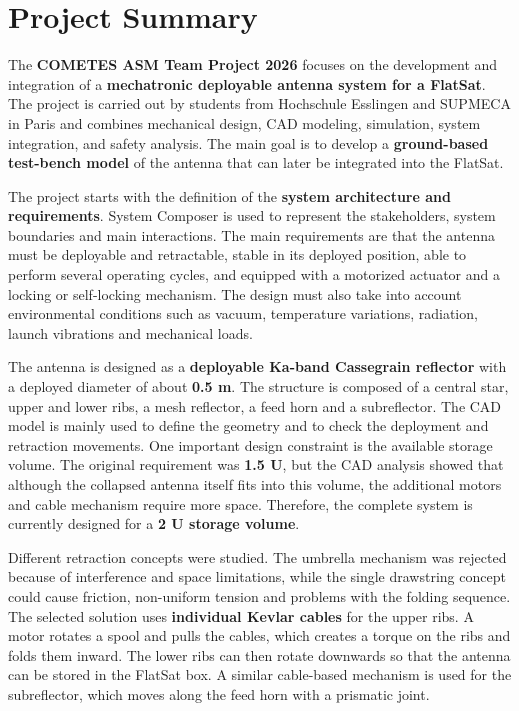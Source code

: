 \chapter{Project Summary}

The \textbf{COMETES ASM Team Project 2026} focuses on the development and integration of a \textbf{mechatronic deployable antenna system for a FlatSat}. The project is carried out by students from Hochschule Esslingen and SUPMECA in Paris and combines mechanical design, CAD modeling, simulation, system integration, and safety analysis. The main goal is to develop a \textbf{ground-based test-bench model} of the antenna that can later be integrated into the FlatSat.

The project starts with the definition of the \textbf{system architecture and requirements}. System Composer is used to represent the stakeholders, system boundaries and main interactions. The main requirements are that the antenna must be deployable and retractable, stable in its deployed position, able to perform several operating cycles, and equipped with a motorized actuator and a locking or self-locking mechanism. The design must also take into account environmental conditions such as vacuum, temperature variations, radiation, launch vibrations and mechanical loads.

The antenna is designed as a \textbf{deployable Ka-band Cassegrain reflector} with a deployed diameter of about \textbf{0.5 m}. The structure is composed of a central star, upper and lower ribs, a mesh reflector, a feed horn and a subreflector. The CAD model is mainly used to define the geometry and to check the deployment and retraction movements. One important design constraint is the available storage volume. The original requirement was \textbf{1.5 U}, but the CAD analysis showed that although the collapsed antenna itself fits into this volume, the additional motors and cable mechanism require more space. Therefore, the complete system is currently designed for a \textbf{2 U storage volume}.

Different retraction concepts were studied. The umbrella mechanism was rejected because of interference and space limitations, while the single drawstring concept could cause friction, non-uniform tension and problems with the folding sequence. The selected solution uses \textbf{individual Kevlar cables} for the upper ribs. A motor rotates a spool and pulls the cables, which creates a torque on the ribs and folds them inward. The lower ribs can then rotate downwards so that the antenna can be stored in the FlatSat box. A similar cable-based mechanism is used for the subreflector, which moves along the feed horn with a prismatic joint.

